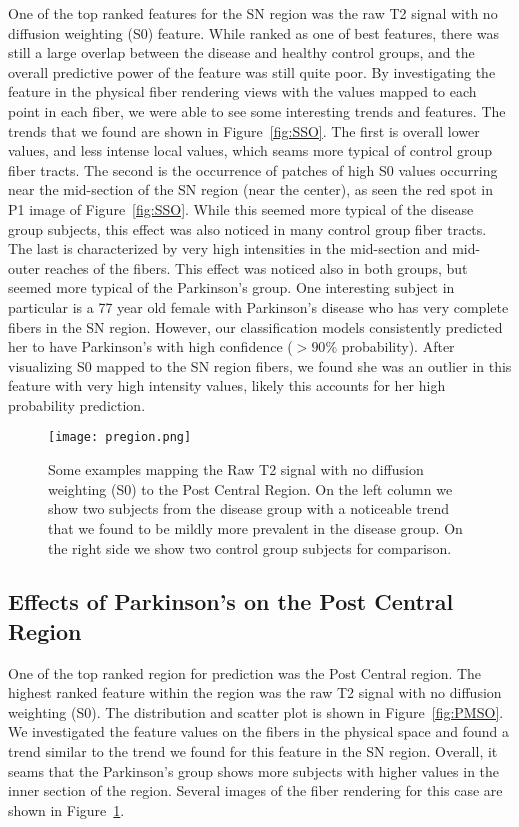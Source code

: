 One of the top ranked features for the SN region was the raw T2 signal with no diffusion weighting (S0) feature. While ranked as one of best features, there was still a large overlap between the disease and healthy control groups, and the overall predictive power of the feature was still quite poor. By investigating the feature in the physical fiber rendering views with the values mapped to each point in each fiber, we were able to see some interesting trends and features. The trends that we found are shown in Figure~\ref{fig:SSO}. The first is overall lower values, and less intense local values, which seams more typical of control group fiber tracts. The second is the occurrence of patches of high S0 values occurring near the mid-section of the SN region (near the center), as seen the red spot in P1 image of Figure~\ref{fig:SSO}. While this seemed more typical of the disease group subjects, this effect was also noticed in many control group fiber tracts. The last is characterized by very high intensities in the mid-section and mid-outer reaches of the fibers. This effect was noticed also in both groups, but seemed more typical of the Parkinson's group. One interesting subject in particular is a 77 year old female with Parkinson's disease who has very complete fibers in the SN region. However, our classification models consistently predicted her to have Parkinson's with high confidence ($>90\%$ probability). After visualizing S0 mapped to the SN region fibers, we found she was an outlier in this feature with very high intensity values, likely this accounts for her high probability prediction.

\begin{figure}[!ht]
\centering
\texttt{[image: pregion.png]}
\caption{Some examples mapping the Raw T2 signal with no diffusion weighting (S0) to the Post Central Region. On the left column we show two subjects from the disease group with a noticeable trend that we found to be mildly more prevalent in the disease group. On the right side we show two control group subjects for comparison.}
\label{fig:pregion}
\end{figure}

\subsection{Effects of Parkinson's on the Post Central Region}

One of the top ranked region for prediction was the Post Central region. The highest ranked feature within the region was the raw T2 signal with no diffusion weighting (S0). The distribution and scatter plot is shown in 
Figure~\ref{fig:PMSO}. We investigated the feature values on the fibers in the physical space and found a trend similar to the trend we found for this feature in the SN region. Overall, it seams that the Parkinson's group shows more subjects with higher values in the inner section of the region. Several images of the fiber rendering for this case are shown in Figure~\ref{fig:pregion}.


